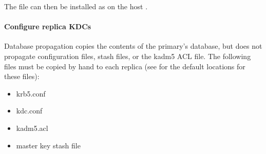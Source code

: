 \documentclass[letterpaper,10pt,english]{sphinxmanual}
\begin{document}
\begin{sphinxVerbatim}[commandchars=\\\{\}]
    
       
         
       
         
\end{sphinxVerbatim}

\sphinxAtStartPar
The file  can then be installed as
 on the host .


\paragraph{Configure replica KDCs}
\label{\detokenize{admin/install_kdc:configure-replica-kdcs}}
\sphinxAtStartPar
Database propagation copies the contents of the primary’s database,
but does not propagate configuration files, stash files, or the kadm5
ACL file.  The following files must be copied by hand to each replica
(see {\hyperref[\detokenize{mitK5defaults:mitk5defaults}]{}} for the default locations for these files):
\begin{itemize}
\item {} 
\sphinxAtStartPar
krb5.conf

\item {} 
\sphinxAtStartPar
kdc.conf

\item {} 
\sphinxAtStartPar
kadm5.acl

\item {} 
\sphinxAtStartPar
master key stash file

\end{itemize}
\end{document}
